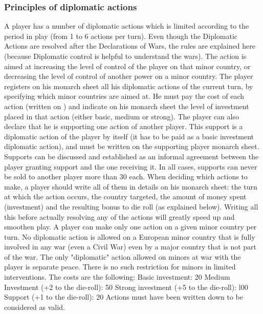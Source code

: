 \subsubsection{Principles of diplomatic actions}
\aparag A player has a number of diplomatic actions which is limited according
to the period in play (from 1 to 6 actions per turn). Even though the
Diplomatic Actions are resolved after the Declarations of Wars, the rules are
explained here (because Diplomatic control is helpful to understand the wars).
\bparag The action is aimed at increasing the level of control of the player
on that minor country, or decreasing the level of control of another power on
a minor country.
\bparag The player registers on his monarch sheet all his diplomatic actions
of the current turn, by specifying which minor countries are aimed at. He must
pay the cost of each action (written on ) and
indicate on his monarch sheet the level of investment placed in that action
(either basic, medium or strong).
\label{chDiplo:Diplomatic Support}
The player can also declare that he is supporting one action of another
player. This support is a diplomatic action of the player by itself (it has to
be paid as a basic investment diplomatic action), and must be written on the
supporting player monarch sheet.
\bparag Supports can be discussed and established as an informal agreement
between the player granting support and the one receiving it.
\bparag In all cases, supports can never be sold to another player more than
30 \ducats each.
 When deciding which actions to make, a player should
write all of them in details on his monarch sheet: the turn at which the
action occurs, the country targeted, the amount of money spent (investment)
and the resulting bonus to die roll (as explained below). Writing all this
before actually resolving any of the actions will greatly speed up and
smoothen play.
\aparag A player can make only one action on a given minor country per turn.
\aparag No diplomatic action is allowed on a European minor country that is
fully involved in any war (even a Civil War) even by a major country that is
not part of the war. The only "diplomatic" action allowed on minors at war
with the player is separate peace. There is no such restriction for minors in
limited interventions.
The costs are the following:
\bparag Basic investment: 20 \ducats
\bparag Medium Investment (+2 to the die-roll): 50 \ducats
\bparag Strong investment (+5 to the die-roll): l00 \ducats
\bparag Support (+1 to the die-roll): 20 \ducats
\aparag Actions must have been written down to be considered as valid.


